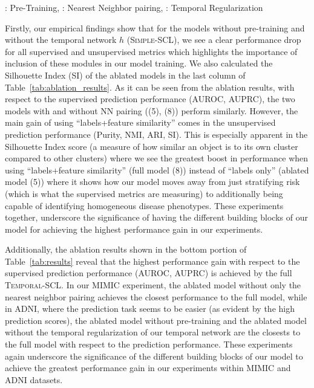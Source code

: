 \documentclass[pmlr,twocolumn,10pt]{jmlr} %
\newcommand{\bftab}{\fontseries{b}\selectfont}
\begin{document}
\begin{table}[ht!]
\vspace{.5ex}
{\scriptsize {\bftab{PT}}: Pre-Training, {\bftab{NN}}: Nearest Neighbor pairing, {\bftab{TR}}: Temporal Regularization\\}
\label{tab:results_future_adni}
\end{table}

Firstly, our empirical findings show that for the models without pre-training and without the temporal network $h$ (\textsc{Simple-SCL}), we see a clear performance drop for all supervised and unsupervised metrics which highlights the importance of inclusion of these modules in our model training.
We also calculated the Silhouette Index (SI) of the ablated models in the last column of Table~\ref{tab:ablation_results}. As it can be seen from the ablation results, with respect to the supervised prediction performance (AUROC, AUPRC), the two models with and without NN pairing ((5), (8)) perform similarly. However, the main gain of using “labels+feature similarity” comes in the unsupervised prediction performance (Purity, NMI, ARI, SI). This is especially apparent in the Silhouette Index score (a measure of how similar an object is to its own cluster compared to other clusters) where we see the greatest boost in performance when using “labels+feature similarity” (full model (8)) instead of “labels only” (ablated model (5)) where it shows how our model moves away from just stratifying risk (which is what the supervised metrics are measuring) to additionally being capable of identifying homogeneous disease phenotypes.
These experiments together, underscore the significance of having the different building blocks of our model for achieving the highest performance gain in our experiments.

Additionally, the ablation results shown in the bottom portion of Table~\ref{tab:results} reveal that the highest performance gain with respect to the supervised prediction performance (AUROC, AUPRC) is achieved by the full \textsc{Temporal-SCL}.
In our MIMIC experiment, the ablated model without only the nearest neighbor pairing achieves the closest performance to the full model, while in ADNI, where the prediction task seems to be easier (as evident by the high prediction scores), the ablated model without pre-training and the ablated model without the temporal regularization of our temporal network are the closests to the full model with respect to the prediction performance.
These experiments again underscore the significance of the different building blocks of our model to achieve the greatest performance gain in our experiments within MIMIC and ADNI datasets.
\end{document}

